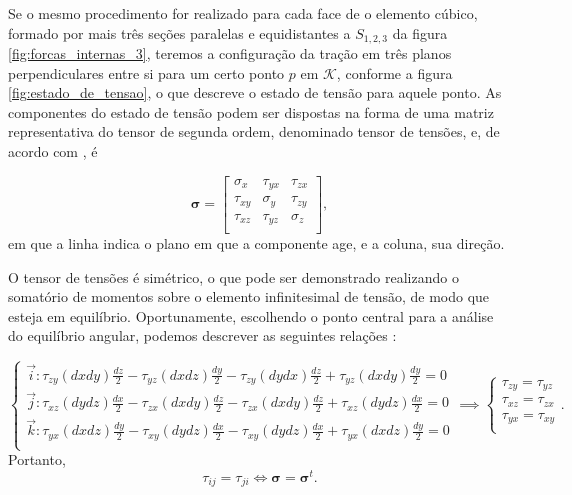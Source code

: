 Se o mesmo procedimento  for realizado para cada face de o elemento cúbico, formado por mais três seções paralelas e equidistantes a $S_{1,2,3}$ da figura \ref{fig:forcas_internas_3}, teremos a configuração da tração em três planos perpendiculares entre si para um certo ponto $p$ em $\mathcal{K}$,  conforme a figura \ref{fig:estado_de_tensao}, o que descreve o estado de tensão para aquele ponto. As componentes do estado de tensão podem ser dispostas na forma de uma matriz representativa do tensor de segunda ordem, denominado tensor de tensões, e, de acordo com , é

\begin{equation}
    \bm{\sigma} =
    \begin{bmatrix}
        \sigma_x & \tau_{yx} & \tau_{zx} \\
        \tau_{xy} & \sigma_{y} & \tau_{zy} \\
        \tau_{xz} & \tau_{yz} & \sigma_{z} \\
    \end{bmatrix},
\end{equation}
em que a linha indica o plano em que a componente age, e a coluna, sua direção.

O tensor de tensões é simétrico, o que pode ser demonstrado realizando o somatório de momentos sobre o elemento infinitesimal de tensão, de modo que esteja em equilíbrio. Oportunamente, escolhendo o ponto central para a análise do equilíbrio angular, podemos descrever as seguintes relações \cite[pág. 8]{popov}:

\begin{equation}
    \begin{cases}
        \displaystyle  \vec{i} : \tau_{zy} (dxdy) \frac{dz}{2} - \tau_{yz} (dx dz) \frac{dy}{2} - \tau_{zy} (dydx) \frac{dz}{2}+ \tau_{yz} (dxdy) \frac{dy}{2} = 0 \\

        \displaystyle  \vec{j} : \tau_{xz} (dydz) \frac{dx}{2} - \tau_{zx} (dx dy) \frac{dz}{2} - \tau_{zx} (dx dy) \frac{dz}{2} + \tau_{xz} (dydz) \frac{dx}{2} = 0 \\

        
        \displaystyle  \vec{k} : \tau_{yx} (dxdz) \frac{dy}{2} - \tau_{xy} (dydz) \frac{dx}{2} - \tau_{xy} (dydz) \frac{dx}{2} + \tau_{yx} (dxdz) \frac{dy}{2} = 0 \\

    \end{cases} \implies
    \begin{cases}
        \tau_{zy} = \tau_{yz} \\
        \tau_{xz} = \tau_{zx} \\
        \tau_{yx} = \tau_{xy} \\
    \end{cases}.
\end{equation}
Portanto,
\begin{equation}
    \tau_{ij} = \tau_{ji} \iff \bm{\sigma} = \bm{\sigma}^t.
\end{equation}

